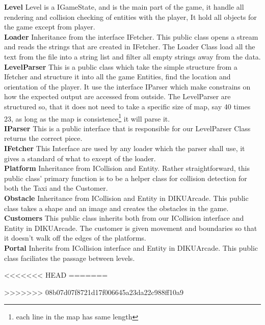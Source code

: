 \documentclass[../master.tex]{subfile}
\begin{document}
\textbf{Level}
Level is a IGameState, and is the main part of the game, it handle all rendering and collision checking of entities with the player, It hold all objects for the game except from player.\\

\textbf{Loader}
Inheritance from the interface IFetcher. This public class opens a stream and reads the strings that are created in IFetcher. The Loader Class load all the text from the file into a string list and filter all empty strings away from the data.\\

\textbf{LevelParser}
This is a public class which take the simple structure from a Ifetcher and structure it into all the game Entities, find the location and orientation of the player. It use the interface IParser which make constrains on how the expected output are accessed from outside. The LevelParser are structured so, that it does not need to take a specific size of map, say 40 times 23, as long as the map is consistence\footnote{each line in the map has same length} it will parse it.\\

\textbf{IParser}
This is a public interface that is responsible for our LevelParser Class returns the correct piece.\\

\textbf{IFetcher}
This Interface are used by any loader which the parser shall use, it gives a standard of what to except of the loader.\\

\textbf{Platform}
Inheritance from ICollision and Entity. Rather straightforward, this public class' primary function is to be a helper class for collision detection for both the Taxi and the Customer.\\

\textbf{Obstacle} 
Inheritance from ICollision and Entity in DIKUArcade. This public class takes a shape and an image and creates the obstacles in the game.\\

\textbf{Customers}
This public class inherits both from our ICollision interface and Entity in DIKUArcade. The customer is given movement and boundaries so that it doesn't walk off the edges of the platforms.\\

\textbf{Portal}
Inherits from ICollision interface and Entity in DIKUArcade. This public class faciliates the passage between levels.

<<<<<<< HEAD
=======

>>>>>>> 08b07d07f8721d17f006645a23da22c988ff10a9
\end{document}
